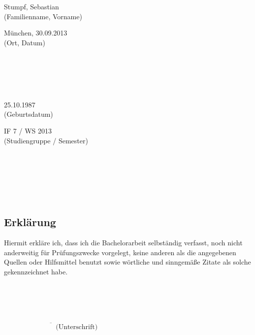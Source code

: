 \newpage
\thispagestyle{empty}
\begin{minipage}[b]{0.5\textwidth} 
Stumpf, Sebastian \\
(Familienname, Vorname)
\end{minipage}
	\hfill
\begin{minipage}[b]{0.5\textwidth}
\begin{flushright}
München, 30.09.2013 \\
(Ort, Datum)
\end{flushright}
\end{minipage}
\\\\\\\\
\begin{minipage}[b]{0.5\textwidth} 
25.10.1987 \\
(Geburtsdatum)
\end{minipage}
	\hfill
\begin{minipage}[b]{0.5\textwidth}
\begin{flushright}
IF 7 / WS 2013 \\
(Studiengruppe / Semester)
\end{flushright}
\end{minipage}
\\ \\ \\ \\ \\
\subsection*{\centering Erklärung}
Hiermit erkläre ich, dass ich die Bachelorarbeit selbständig verfasst, noch nicht anderweitig für Prüfungszwecke vorgelegt, keine anderen als die angegebenen Quellen oder Hilfsmittel benutzt sowie wörtliche und sinngemäße Zitate als solche gekennzeichnet habe.\\\\\\\\\\
\begin{flushright}
$\overline{~~~~~~~~~~~~~~~~~~~~~~~~~~~~~~~~~~\mbox{(Unterschrift)}}$
\end{flushright}
